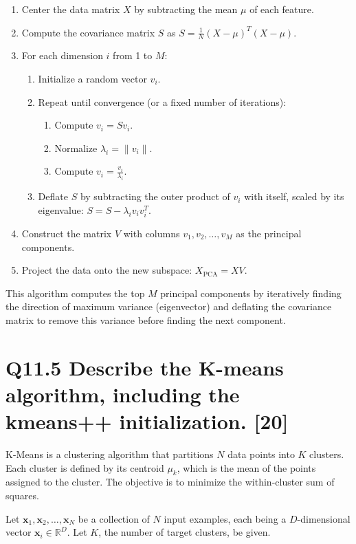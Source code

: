 \documentclass[11pt]{article}
\begin{document}
\begin{enumerate}
    \item Center the data matrix \( X \) by subtracting the mean \( \mu \) of each feature.
    \item Compute the covariance matrix \( S \) as \( S = \frac{1}{N} (X - \mu)^T(X - \mu) \).
    \item For each dimension \( i \) from 1 to \( M \):
    \begin{enumerate}
        \item Initialize a random vector \( v_i \).
        \item Repeat until convergence (or a fixed number of iterations):
        \begin{enumerate}
            \item Compute \( v_i = Sv_i \).
            \item Normalize \( \lambda_i = \|v_i\| \).
            \item Compute \( v_i = \frac{v_i}{\lambda_i} \).
        \end{enumerate}
        \item Deflate \( S \) by subtracting the outer product of \( v_i \) with itself, scaled by its eigenvalue: \( S = S - \lambda_i v_i v_i^T \).
    \end{enumerate}
    \item Construct the matrix \( V \) with columns \( v_1, v_2, \ldots, v_M \) as the principal components.
    \item Project the data onto the new subspace: \( X_{\text{PCA}} = XV \).
\end{enumerate}

This algorithm computes the top \( M \) principal components by iteratively finding the direction of maximum variance (eigenvector) and deflating the covariance matrix to remove this variance before finding the next component.

\section{Q11.5 Describe the K-means algorithm, including the kmeans++ initialization. [20]}

K-Means is a clustering algorithm that partitions \( N \) data points into \( K \) clusters. Each cluster is defined by its centroid \( \mu_k \), which is the mean of the points assigned to the cluster. The objective is to minimize the within-cluster sum of squares.

Let \( \mathbf{x}_1, \mathbf{x}_2, \ldots, \mathbf{x}_N \) be a collection of \( N \) input examples, each being a \( D \)-dimensional vector \( \mathbf{x}_i \in \mathbb{R}^D \). Let \( K \), the number of target clusters, be given.
\end{document}
